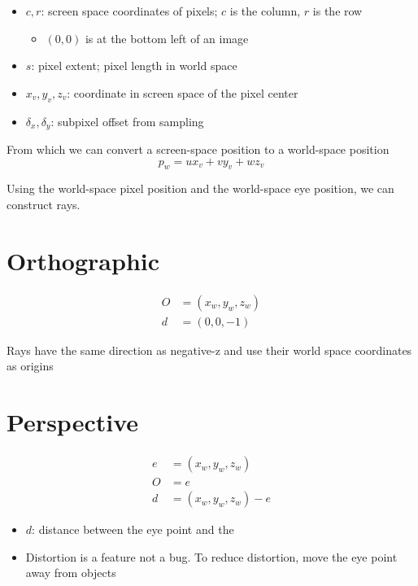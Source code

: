   \begin{itemize}
    \item $ c, r $: screen space coordinates of pixels; $ c $ is the column,
    $ r $ is the row
    \begin{itemize}
      \item $ \left( 0, 0 \right) $ is at the bottom left of an image
    \end{itemize}

    \item $ s $: pixel extent; pixel length in world space
    \item $ x_{v}, y_{v}, z_{v} $: coordinate in screen space of the pixel center
    \item $ \delta_{x}, \delta_{y} $: subpixel offset from sampling
  \end{itemize}

  From which we can convert a screen-space position to a world-space position
  \begin{equation}
    p_{w} = u x_{v} + v y_{v} + w z_{v}
  \end{equation}

  Using the world-space pixel position and the world-space eye position,
  we can construct rays.

\section{Orthographic}

  \begin{align}
    O &= \left( x_{w}, y_{w}, z_{w} \right) \\
    d &= \left( 0, 0, -1 \right)
  \end{align}

  Rays have the same direction as negative-z and use their world space
  coordinates as origins

\section{Perspective}

  \begin{align}
    e &= \left( x_{w}, y_{w}, z_{w} \right) \\
    O &= e  \\
    d &= \left( x_{w}, y_{w}, z_{w} \right) - e
  \end{align}

  \begin{itemize}
    \item $ d $: distance between the eye point and the 
    \item Distortion is a feature not a bug. To reduce distortion, move
    the eye point away from objects
  \end{itemize}
